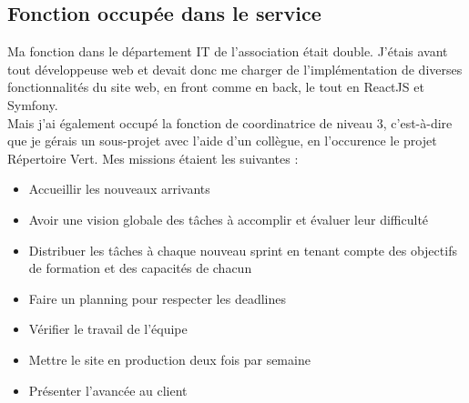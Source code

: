 \pagebreak

\subsection{Fonction occupée dans le service}
Ma fonction dans le département IT de l'association était double. 
J'étais avant tout développeuse web et devait donc me charger de l'implémentation de diverses fonctionnalités du site web, en front comme en back, le tout en ReactJS et Symfony.
\\
Mais j'ai également occupé la fonction de coordinatrice de niveau 3, 
c'est-à-dire que je gérais un sous-projet avec l'aide d'un collègue, en l'occurence le projet Répertoire Vert. Mes missions étaient les suivantes :
\begin{itemize}
    \item Accueillir les nouveaux arrivants
    \item Avoir une vision globale des tâches à accomplir et évaluer leur difficulté
    \item Distribuer les tâches à chaque nouveau sprint en tenant compte des objectifs de formation et des capacités de chacun
    \item Faire un planning pour respecter les deadlines
    \item Vérifier le travail de l'équipe
    \item Mettre le site en production deux fois par semaine
    \item Présenter l'avancée au client
\end{itemize}






